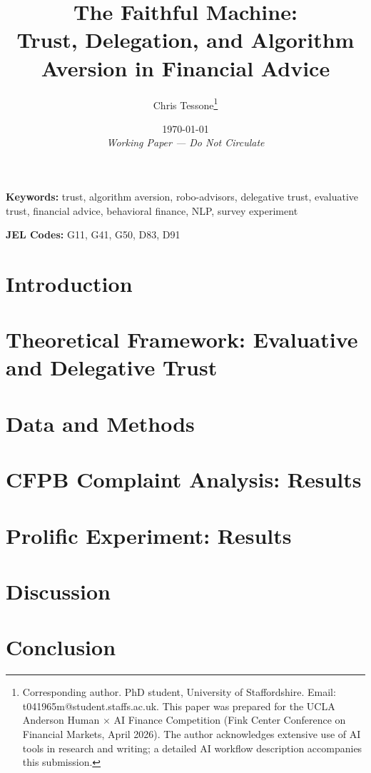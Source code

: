 \documentclass[letterpaper]{article}
\title{The Faithful Machine: \\
       Trust, Delegation, and Algorithm \\
       Aversion in Financial Advice}
\author{Chris Tessone\thanks{Corresponding author. PhD student, University of Staffordshire. Email: t041965m@student.staffs.ac.uk. 
This paper was prepared for the UCLA Anderson Human $\times$ AI Finance Competition 
(Fink Center Conference on Financial Markets, April 2026). 
The author acknowledges extensive use of AI tools in research and writing; 
a detailed AI workflow description accompanies this submission.}}
\date{\today \\ \small \textit{Working Paper --- Do Not Circulate}}
\begin{document}
\maketitle

\begin{abstract}

\end{abstract}

\noindent\textbf{Keywords:} trust, algorithm aversion, robo-advisors, delegative trust, 
evaluative trust, financial advice, behavioral finance, NLP, survey experiment

\noindent\textbf{JEL Codes:} G11, G41, G50, D83, D91

\clearpage
\tableofcontents
\clearpage


\section{Introduction}
\label{sec:introduction}


\section{Theoretical Framework: Evaluative and Delegative Trust}
\label{sec:theory}


\section{Data and Methods}
\label{sec:data_methods}


\section{CFPB Complaint Analysis: Results}
\label{sec:results_cfpb}


\section{Prolific Experiment: Results}
\label{sec:results_prolific}


\section{Discussion}
\label{sec:discussion}


\section{Conclusion}
\label{sec:conclusion}

\end{document}
